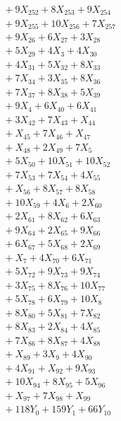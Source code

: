 \documentclass[a4paper,10pt]{article}
\begin{document}
{\begin{align}
&\quad  + 9X_{252} + 8X_{253} + 9X_{254} \\[0.5ex]
&\quad  + 9X_{255} + 10X_{256} + 7X_{257} \\[0.5ex]
&\quad  + 9X_{26} + 6X_{27} + 3X_{28} \\[0.5ex]
&\quad  + 5X_{29} + 4X_{3} + 4X_{30} \\[0.5ex]
&\quad  + 4X_{31} + 5X_{32} + 8X_{33} \\[0.5ex]
&\quad  + 7X_{34} + 3X_{35} + 8X_{36} \\[0.5ex]
&\quad  + 7X_{37} + 8X_{38} + 5X_{39} \\[0.5ex]
&\quad  + 9X_{4} + 6X_{40} + 6X_{41} \\[0.5ex]
&\quad  + 3X_{42} + 7X_{43} + X_{44} \\[0.5ex]
&\quad  + X_{45} + 7X_{46} + X_{47} \\[0.5ex]
&\quad  + X_{48} + 2X_{49} + 7X_{5} \\[0.5ex]
&\quad  + 5X_{50} + 10X_{51} + 10X_{52} \\[0.5ex]
&\quad  + 7X_{53} + 7X_{54} + 4X_{55} \\[0.5ex]
&\quad  + X_{56} + 8X_{57} + 8X_{58} \\[0.5ex]
&\quad  + 10X_{59} + 4X_{6} + 2X_{60} \\[0.5ex]
&\quad  + 2X_{61} + 8X_{62} + 6X_{63} \\[0.5ex]
&\quad  + 9X_{64} + 2X_{65} + 9X_{66} \\[0.5ex]
&\quad  + 6X_{67} + 5X_{68} + 2X_{69} \\[0.5ex]
&\quad  + X_{7} + 4X_{70} + 6X_{71} \\[0.5ex]
&\quad  + 5X_{72} + 9X_{73} + 9X_{74} \\[0.5ex]
&\quad  + 3X_{75} + 8X_{76} + 10X_{77} \\[0.5ex]
&\quad  + 5X_{78} + 6X_{79} + 10X_{8} \\[0.5ex]
&\quad  + 8X_{80} + 5X_{81} + 7X_{82} \\[0.5ex]
&\quad  + 8X_{83} + 2X_{84} + 4X_{85} \\[0.5ex]
&\quad  + 7X_{86} + 8X_{87} + 4X_{88} \\[0.5ex]
&\quad  + X_{89} + 3X_{9} + 4X_{90} \\[0.5ex]
&\quad  + 4X_{91} + X_{92} + 9X_{93} \\[0.5ex]
&\quad  + 10X_{94} + 8X_{95} + 5X_{96} \\[0.5ex]
&\quad  + X_{97} + 7X_{98} + X_{99} \\[0.5ex]
&\quad  + 118Y_{0} + 159Y_{1} + 66Y_{10} \\[0.5ex]

\end{align}}
\end{document}
